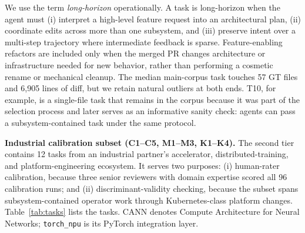 We use the term \emph{long-horizon} operationally. A task is long-horizon when the agent must (i) interpret a high-level feature request into an architectural plan, (ii) coordinate edits across more than one subsystem, and (iii) preserve intent over a multi-step trajectory where intermediate feedback is sparse. Feature-enabling refactors are included only when the merged PR changes architecture or infrastructure needed for new behavior, rather than performing a cosmetic rename or mechanical cleanup. The median main-corpus task touches 57 GT files and 6{,}905 lines of diff, but we retain natural outliers at both ends. T10, for example, is a single-file task that remains in the corpus because it was part of the selection process and later serves as an informative sanity check: agents can pass a subsystem-contained task under the same protocol.

\textbf{Industrial calibration subset (C1--C5, M1--M3, K1--K4).}
The second tier contains 12 tasks from an industrial partner's accelerator, distributed-training, and platform-engineering ecosystem. It serves two purposes: (i) human-rater calibration, because three senior reviewers with domain expertise scored all 96 calibration runs; and (ii) discriminant-validity checking, because the subset spans subsystem-contained operator work through Kubernetes-class platform changes. Table~\ref{tab:tasks} lists the tasks. CANN denotes Compute Architecture for Neural Networks; \texttt{torch\_npu} is its PyTorch integration layer.

